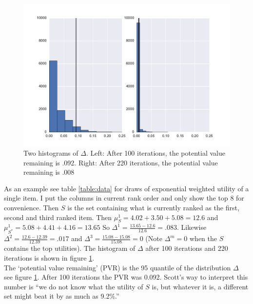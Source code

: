 \documentclass[nonblindrev]{informs3}
\begin{document}
\begin{figure}
\includegraphics[width=1\linewidth]{plots/valremhist.pdf}
\caption{Two histograms of $\Delta$. Left: After 100 iterations, the potential value remaining is .092. Right: After 220 iterations, the potential value remaining is .008}
\label{fig:data}
\end{figure}
As an example see table \ref{table:data} for draws of exponential weighted utility of a single item. I put the columns in current rank order and only show the top 8 for convenience. Then $S$ is the set containing what is currently ranked as the first, second and third ranked item. Then $\mu^1_{S}=4.02+3.50+5.08=12.6$ and $\mu_{S^*}^{1}=5.08+4.41+4.16=13.65$ So $\Delta^{1}=\frac{13.65-12.6}{12.6}=.083$. Likewise $\Delta^{2}=\frac{12.6-12.39}{12.39}=.017$ and $\Delta^{3}=\frac{15.08-15.08}{15.08}=0$ (Note $\Delta^m=0$ when the $S$ contains the top utilities). The histogram of $\Delta$ after 100 iterations and 220 iterations is shown in figure \ref{fig:data}. \\
The `potential value remaining' (PVR) is the 95 quantile of the distribution $\Delta$ see figure \ref{fig:data}. After 100 iterations the PVR was 0.092. Scott's way to interpret this number is ``we do not know what the utility of $S$ is, but whatever it is, a different set might beat it by as much as 9.2\%.''\\
\end{document}
